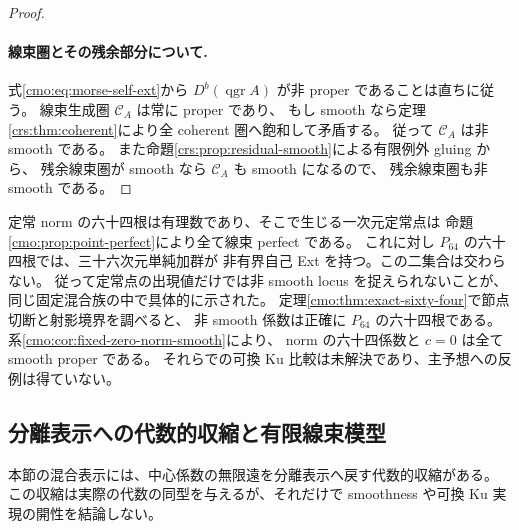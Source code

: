 \begin{proof}
\paragraph{線束圏とその残余部分について.}
式\eqref{cmo:eq:morse-self-ext}から
$D^b(\operatorname{qgr}A)$ が非 proper であることは直ちに従う。
線束生成圏 $\mathcal C_A$ は常に proper であり、
もし smooth なら定理\ref{crs:thm:coherent}により全 coherent 圏へ飽和して矛盾する。
従って $\mathcal C_A$ は非 smooth である。
また命題\ref{crs:prop:residual-smooth}による有限例外 gluing から、
残余線束圏が smooth なら $\mathcal C_A$ も smooth になるので、
残余線束圏も非 smooth である。

\end{proof}

\begin{remark}[二種類の六十四係数]
定常 norm の六十四根は有理数であり、そこで生じる一次元定常点は
命題\ref{cmo:prop:point-perfect}により全て線束 perfect である。
これに対し $P_{64}$ の六十四根では、三十六次元単純加群が
非有界自己 Ext を持つ。この二集合は交わらない。
従って定常点の出現値だけでは非 smooth locus を捉えられないことが、
同じ固定混合族の中で具体的に示された。
定理\ref{cmo:thm:exact-sixty-four}で節点切断と射影境界を調べると、
非 smooth 係数は正確に $P_{64}$ の六十四根である。
系\ref{cmo:cor:fixed-zero-norm-smooth}により、
norm の六十四係数と $c=0$ は全て smooth proper である。
それらでの可換 Ku 比較は未解決であり、主予想への反例は得ていない。
\end{remark}

\subsection{分離表示への代数的収縮と有限線束模型}

本節の混合表示には、中心係数の無限遠を分離表示へ戻す代数的収縮がある。
この収縮は実際の代数の同型を与えるが、それだけで
smoothness や可換 Ku 実現の開性を結論しない。

